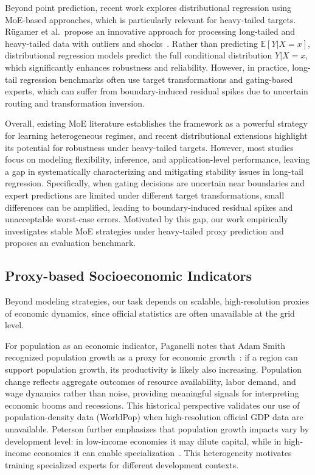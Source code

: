\documentclass[pdflatex,sn-basic,Numbered]{sn-jnl}
\begin{document}
Beyond point prediction, recent work explores distributional regression using MoE-based approaches, which is particularly relevant for heavy-tailed targets. Rügamer et al.\ propose an innovative approach for processing long-tailed and heavy-tailed data with outliers and shocks~\cite{rugamer2024mixdistreg}. Rather than predicting $\mathbb{E}[Y|X = x]$, distributional regression models predict the full conditional distribution $Y|X=x$, which significantly enhances robustness and reliability. However, in practice, long-tail regression benchmarks often use target transformations and gating-based experts, which can suffer from boundary-induced residual spikes due to uncertain routing and transformation inversion.

Overall, existing MoE literature establishes the framework as a powerful strategy for learning heterogeneous regimes, and recent distributional extensions highlight its potential for robustness under heavy-tailed targets. However, most studies focus on modeling flexibility, inference, and application-level performance, leaving a gap in systematically characterizing and mitigating stability issues in long-tail regression. Specifically, when gating decisions are uncertain near boundaries and expert predictions are limited under different target transformations, small differences can be amplified, leading to boundary-induced residual spikes and unacceptable worst-case errors. Motivated by this gap, our work empirically investigates stable MoE strategies under heavy-tailed proxy prediction and proposes an evaluation benchmark.

\subsection{Proxy-based Socioeconomic Indicators}
Beyond modeling strategies, our task depends on scalable, high-resolution proxies of economic dynamics, since official statistics are often unavailable at the grid level.

For population as an economic indicator, Paganelli notes that Adam Smith recognized population growth as a proxy for economic growth~\cite{paganelli2021populationgdp}: if a region can support population growth, its productivity is likely also increasing. Population change reflects aggregate outcomes of resource availability, labor demand, and wage dynamics rather than noise, providing meaningful signals for interpreting economic booms and recessions. This historical perspective validates our use of population-density data (WorldPop) when high-resolution official GDP data are unavailable. Peterson further emphasizes that population growth impacts vary by development level: in low-income economies it may dilute capital, while in high-income economies it can enable specialization~\cite{peterson2017rolepopulation}. This heterogeneity motivates training specialized experts for different development contexts.
\end{document}
